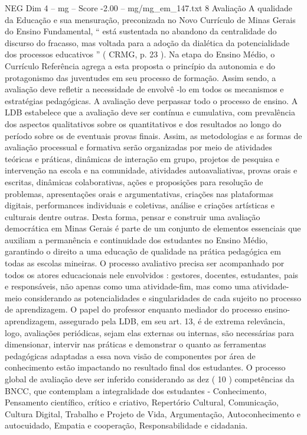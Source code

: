 \begin{textsample}{NEG Dim 4 – mg – Score -2.00 – mg/mg\_em\_147.txt}  \label{ex:f4_neg_100}
8 Avaliação A qualidade da Educação e sua mensuração, preconizada no Novo Currículo de Minas Gerais do Ensino Fundamental, “ está sustentada no abandono da centralidade do discurso do fracasso, mas voltada para a adoção da dialética da potencialidade dos processos educativos ” ( CRMG, p. 23 ).
Na etapa do Ensino Médio, o Currículo Referência agrega a esta proposta o princípio da autonomia e do protagonismo das juventudes em seu processo de formação.
Assim sendo, a avaliação deve refletir a necessidade de envolvê -lo em todos os mecanismos e estratégias pedagógicas.
A avaliação deve perpassar todo o processo de ensino.
A LDB estabelece que a avaliação deve ser contínua e cumulativa, com prevalência dos aspectos qualitativos sobre os quantitativos e dos resultados ao longo do período sobre os de eventuais provas finais.
Assim, as metodologias e as formas de avaliação processual e formativa serão organizadas por meio de atividades teóricas e práticas, dinâmicas de interação em grupo, projetos de pesquisa e intervenção na escola e na comunidade, atividades autoavaliativas, provas orais e escritas, dinâmicas colaborativas, ações e proposições para resolução de problemas, apresentações orais e argumentativas, criações nas plataformas digitais, performances individuais e coletivas, análise e criações artísticas e culturais dentre outras.
Desta forma, pensar e construir uma avaliação democrática em Minas Gerais é parte de um conjunto de elementos essenciais que auxiliam a permanência e continuidade dos estudantes no Ensino Médio, garantindo o direito a uma educação de qualidade na prática pedagógica em todas as escolas mineiras.
O processo avaliativo precisa ser acompanhado por todos os atores educacionais nele envolvidos : gestores, docentes, estudantes, pais e responsáveis, não apenas como uma atividade-fim, mas como uma atividade-meio considerando as potencialidades e singularidades de cada sujeito no processo de aprendizagem.
O papel do professor enquanto mediador do processo ensino-aprendizagem, assegurado pela LDB, em seu art. 13, é de extrema relevância, logo, avaliações periódicas, sejam elas externas ou internas, são necessárias para dimensionar, intervir nas práticas e demonstrar o quanto as ferramentas pedagógicas adaptadas a essa nova visão de componentes por área de conhecimento estão impactando no resultado final dos estudantes.
O processo global de avaliação deve ser inferido considerando as dez ( 10 ) competências da BNCC, que contemplam a integralidade dos estudantes - Conhecimento, Pensamento científico, crítico e criativo, Repertório Cultural, Comunicação, Cultura Digital, Trabalho e Projeto de Vida, Argumentação, Autoconhecimento e autocuidado, Empatia e cooperação, Responsabilidade e cidadania.

\end{textsample}
